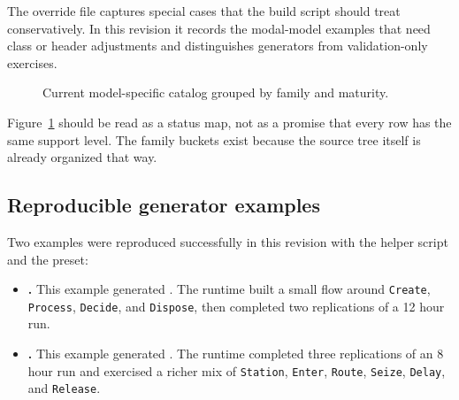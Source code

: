 The override file 
captures special cases that the build script should treat conservatively. In
this revision it records the modal-model examples that need class or header
adjustments and distinguishes generators from validation-only exercises.

\begin{figure}[htbp]
\centering
\caption{Current model-specific catalog grouped by family and maturity.}
\label{fig:model-specific-catalog-matrix}
\end{figure}

Figure~\ref{fig:model-specific-catalog-matrix} should be read as a status map,
not as a promise that every row has the same support level. The family buckets
exist because the source tree itself is already organized that way.

\subsection{Reproducible generator examples}
\label{subsec:model-specific-reproducible-examples}

Two examples were reproduced successfully in this revision with the helper
script  and the
 preset:
\begin{itemize}
\item \textbf{.} This example
generated . The runtime built a small
flow around \texttt{Create}, \texttt{Process}, \texttt{Decide}, and
\texttt{Dispose}, then completed two replications of a 12 hour run.
\item \textbf{.} This example
generated . The runtime completed
three replications of an 8 hour run and exercised a richer mix of
\texttt{Station}, \texttt{Enter}, \texttt{Route}, \texttt{Seize},
\texttt{Delay}, and \texttt{Release}.
\end{itemize}

